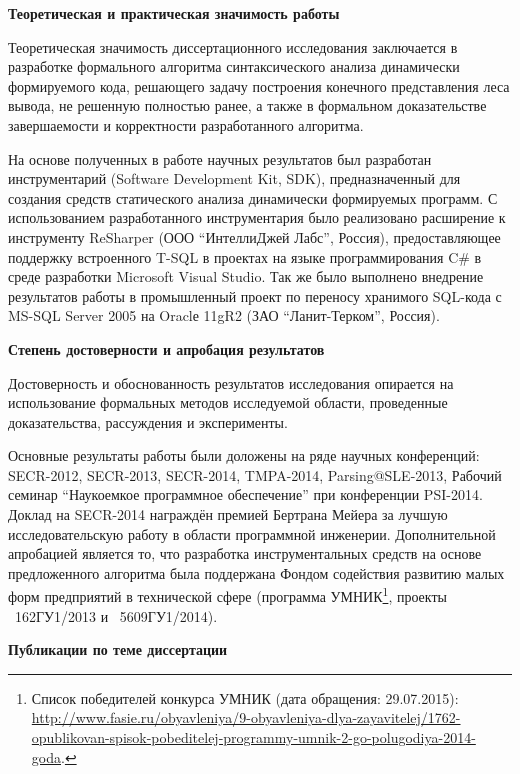 \textbf{Теоретическая и практическая значимость работы}

Теоретическая значимость диссертационного исследования заключается в разработке формального алгоритма синтаксического анализа динамически формируемого кода, решающего задачу построения конечного представления леса вывода, не решенную полностью ранее, а также в формальном доказательстве завершаемости и корректности разработанного алгоритма. 

На основе полученных в работе научных результатов был разработан инструментарий (Software Development Kit, SDK), предназначенный для создания средств статического анализа динамически формируемых программ. 
С использованием разработанного инструментария было реализовано расширение к инструменту ReSharper (ООО ``ИнтеллиДжей Лабс'', Россия), предоставляющее поддержку встроенного T-SQL в проектах на языке программирования C\# в среде разработки Microsoft Visual Studio. Так же было выполнено внедрение результатов работы в промышленный проект по переносу хранимого SQL-кода с MS-SQL Server 2005 на Oraclе 11gR2 (ЗАО ``Ланит-Терком'', Россия). 

\textbf{Степень достоверности и апробация результатов}

Достоверность и обоснованность результатов исследования опирается на использование формальных методов исследуемой области, проведенные доказательства, рассуждения и эксперименты.

Основные результаты работы были доложены на ряде научных конференций: SECR-2012, SECR-2013, SECR-2014, TMPA-2014, Parsing@SLE-2013, Рабочий семинар ``Наукоемкое программное обеспечение'' при конференции PSI-2014. Доклад на SECR-2014 награждён премией Бертрана Мейера за лучшую исследовательскую работу в области программной инженерии. Дополнительной апробацией является то, что разработка инструментальных средств на основе предложенного алгоритма была поддержана Фондом содействия развитию малых форм предприятий в технической сфере (программа УМНИК\footnote{Список победителей конкурса УМНИК (дата обращения: 29.07.2015): \url{http://www.fasie.ru/obyavleniya/9-obyavleniya-dlya-zayavitelej/1762-opublikovan-spisok-pobeditelej-programmy-umnik-2-go-polugodiya-2014-goda}.}, проекты \textnumero~162ГУ1/2013 и \textnumero~5609ГУ1/2014).

\textbf{Публикации по теме диссертации}

